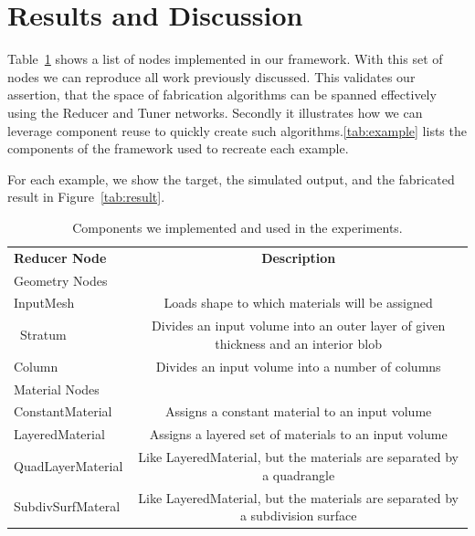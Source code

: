 \documentclass[annual]{acmsiggraph}
\newcommand{\note}[1]{\marginpar{\LARGE $\spadesuit$}
			$\spadesuit$ {\bf #1} $\spadesuit$}
\begin{document}
%
%
%

\section{Results and Discussion}
Table~\ref{tab:built-in} shows a list of nodes implemented in our framework. With this set of nodes we can reproduce all work previously discussed. This validates our assertion, that the space of fabrication  algorithms can be spanned effectively using the Reducer and Tuner networks. Secondly it illustrates how we can leverage component reuse to quickly create such algorithms.\autoref{tab:example} lists the components of the framework used to recreate each example.

For each example, we show the target, the simulated output, and the fabricated result in Figure~\ref{tab:result}.


\begin{table}
\centering
\begin{tabular}{lc}
\hline
\textbf{Reducer Node} & \textbf{Description} \\
Geometry Nodes &\\
\hline
InputMesh & Loads shape to which materials will be assigned\\\
Stratum & Divides an input volume into an outer layer of given thickness and an interior blob\\
Column & Divides an input volume into a number of columns\\
\hline
Material Nodes &\\
\hline
ConstantMaterial & Assigns a constant material to an input volume \\
LayeredMaterial &  Assigns a layered set of materials to an input volume \\
QuadLayerMaterial & Like LayeredMaterial, but the materials are separated by a quadrangle\\
SubdivSurfMateral & Like LayeredMaterial, but the materials are separated by a subdivision surface \\
\hline
\end{tabular}
\caption{Components we implemented and used in the experiments.}
\label{tab:built-in}
\end{table}
\end{document}
